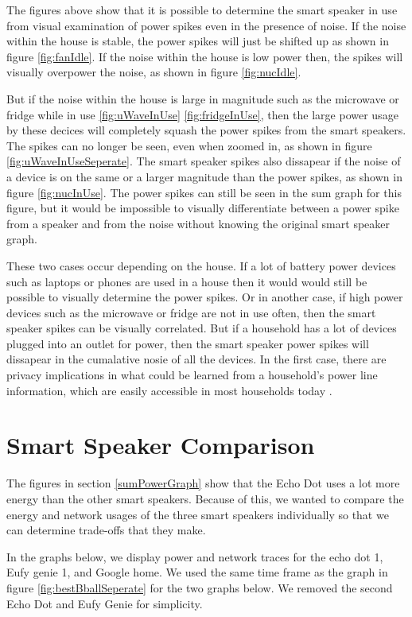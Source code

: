 The figures above show that it is possible to determine the smart speaker in use from visual examination of power spikes even in the presence of noise. If the noise within the house is stable, the power spikes will just be shifted up as shown in figure \ref{fig:fanIdle}. If the noise within the house is low power then, the spikes will visually overpower the noise, as shown in figure \ref{fig:nucIdle}.

But if the noise within the house is large in magnitude such as the microwave or fridge while in use \ref{fig:uWaveInUse} \ref{fig:fridgeInUse}, then the large power usage by these decices will completely squash the power spikes from the smart speakers. The spikes can no longer be seen, even when zoomed in, as shown in figure \ref{fig:uWaveInUseSeperate}. The smart speaker spikes also dissapear if the noise of a device is on the same or a larger magnitude than the power spikes, as shown in figure \ref{fig:nucInUse}. The power spikes can still be seen in the sum graph for this figure, but it would be impossible to visually differentiate between a power spike from a speaker and from the noise without knowing the original smart speaker graph.

These two cases occur depending on the house. If a lot of battery power devices such as laptops or phones are used in a house then it would would still be possible to visually determine the power spikes. Or in another case, if high power devices such as the microwave or fridge are not in use often, then the smart speaker spikes can be visually correlated. But if a household has a lot of devices plugged into an outlet for power, then the smart speaker power spikes will dissapear in the cumalative nosie of all the devices. In the first case, there are privacy implications in what could be learned from a household's power line information, which are easily accessible in most households today \cite{griffith_2017}.

\section{Smart Speaker Comparison}
\label{smartSpeakerComparisonSection}
The figures in section \ref{sumPowerGraph} show that the Echo Dot uses a lot more energy than the other smart speakers. Because of this, we wanted to compare the energy and network usages of the three smart speakers individually so that we can determine trade-offs that they make.

In the graphs below, we display power and network traces for the echo dot 1, Eufy genie 1, and Google home. We used the same time frame as the graph in figure \ref{fig:bestBballSeperate} for the two graphs below. We removed the second Echo Dot and Eufy Genie for simplicity.

